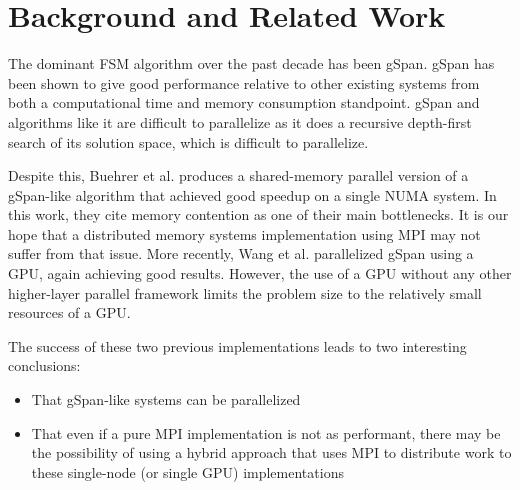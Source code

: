 \section{Background and Related Work}
\label{sec:background}

The dominant FSM algorithm over the past decade has been gSpan\cite{gspan}. 
gSpan has been shown to give good performance relative to other existing
systems from both a computational time and memory consumption standpoint.
gSpan and algorithms like it are difficult to parallelize as it does a 
recursive depth-first search of its solution space, which is difficult to 
parallelize.  

Despite this, Buehrer et al. produces a shared-memory
parallel version of a gSpan-like algorithm that achieved good speedup on a 
single NUMA system\cite{buehrer2005parallel}.  In this work, they cite 
memory contention as one of their main bottlenecks. It is our hope that
a distributed memory systems implementation using MPI may not suffer
from that issue.  More recently, Wang et al. parallelized gSpan using a 
GPU\cite{gspancuda}, again achieving good results.  However, the use of a 
GPU without any other higher-layer parallel framework limits the problem
size to the relatively small resources of a GPU. 

The success of these two previous implementations leads to two interesting
conclusions:
\begin{itemize}
	\item{That gSpan-like systems can be parallelized}
	\item{That even if a pure MPI implementation is not as performant, 
		there may be the possibility of using a hybrid approach
		that uses MPI to distribute work to these single-node 
		(or single GPU) implementations}
\end{itemize}

